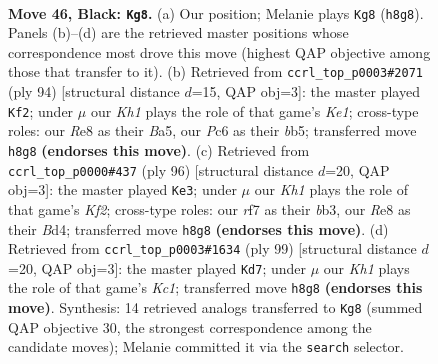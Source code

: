 \documentclass[11pt]{article}
\begin{document}
\clearpage

\begin{figure}[p]\centering
\begin{subfigure}{0.46\textwidth}\centering
\resizebox{\linewidth}{!}{%
\newchessgame
\chessboard[
  setfen={4r2k/5R2/p1p5/8/8/B6b/5K2/1N6 b - - 4 46},
  showmover=false,
  pgfstyle=straightmove, color=movearrow, markmove={h8-g8}
]}
\caption{}
\end{subfigure}\hfill
\begin{subfigure}{0.46\textwidth}\centering
\resizebox{\linewidth}{!}{%
\newchessgame
\chessboard[
  setfen={8/8/7R/Bbr5/8/8/2k4P/4K3 w - - 2 48},
  showmover=false,
  pgfstyle=straightmove, color=movearrow, markmove={e1-f2}
]}
\caption{}
\end{subfigure}
\\[4pt]
\begin{subfigure}{0.46\textwidth}\centering
\resizebox{\linewidth}{!}{%
\newchessgame
\chessboard[
  setfen={8/8/4k3/1r6/3B1R2/1b6/5K1P/8 w - - 5 49},
  showmover=false,
  pgfstyle=straightmove, color=movearrow, markmove={f2-e3}
]}
\caption{}
\end{subfigure}\hfill
\begin{subfigure}{0.46\textwidth}\centering
\resizebox{\linewidth}{!}{%
\newchessgame
\chessboard[
  setfen={2k1r3/8/8/3B4/1K5R/8/6P1/b7 b - - 0 50},
  showmover=false,
  pgfstyle=straightmove, color=movearrow, markmove={c8-d7}
]}
\caption{}
\end{subfigure}
\caption{\textbf{Move 46, Black: \texttt{Kg8}.} (a) Our position; Melanie plays \texttt{Kg8} (\texttt{h8g8}). Panels (b)--(d) are the retrieved master positions whose correspondence most drove this move (highest QAP objective among those that transfer to it). (b) Retrieved from \texttt{ccrl\_top\_p0003\#2071} (ply 94) [structural distance $d$=15, QAP obj=3]: the master played \texttt{Kf2}; under $\mu$ our \emph{Kh1} plays the role of that game's \emph{Ke1}; cross-type roles: our \emph{R}e8 as their \emph{B}a5, our \emph{P}c6 as their \emph{b}b5; transferred move \texttt{h8g8} \textbf{(endorses this move)}. (c) Retrieved from \texttt{ccrl\_top\_p0000\#437} (ply 96) [structural distance $d$=20, QAP obj=3]: the master played \texttt{Ke3}; under $\mu$ our \emph{Kh1} plays the role of that game's \emph{Kf2}; cross-type roles: our \emph{r}f7 as their \emph{b}b3, our \emph{R}e8 as their \emph{B}d4; transferred move \texttt{h8g8} \textbf{(endorses this move)}. (d) Retrieved from \texttt{ccrl\_top\_p0003\#1634} (ply 99) [structural distance $d$=20, QAP obj=3]: the master played \texttt{Kd7}; under $\mu$ our \emph{Kh1} plays the role of that game's \emph{Kc1}; transferred move \texttt{h8g8} \textbf{(endorses this move)}. Synthesis: 14 retrieved analogs transferred to \texttt{Kg8} (summed QAP objective 30, the strongest correspondence among the candidate moves); Melanie committed it via the \texttt{search} selector.}
\label{fig:thought-m91}
\end{figure}
\end{document}
